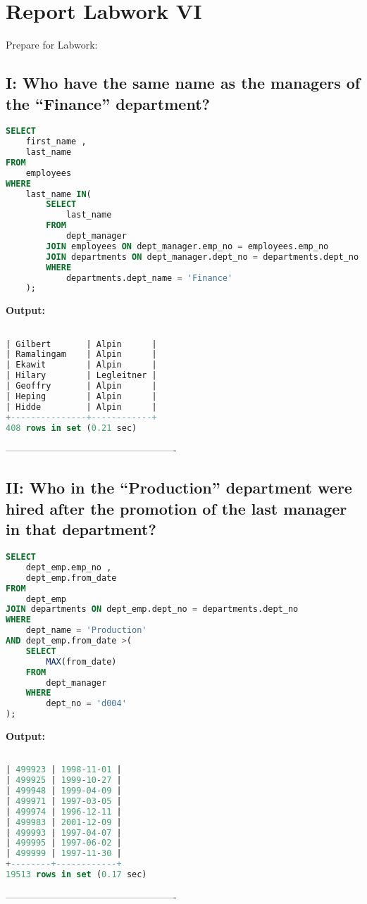 \documentclass[12pt]{report}
\begin{document}
\section*{Report Labwork VI}

Prepare for Labwork:

{\small
{}}

\subsection*{I: Who have the same name as the managers of the “Finance” department?}

\begin{lstlisting}[language=sql]
SELECT
	first_name ,
	last_name
FROM
	employees
WHERE
	last_name IN(
		SELECT
			last_name
		FROM
			dept_manager
		JOIN employees ON dept_manager.emp_no = employees.emp_no
		JOIN departments ON dept_manager.dept_no = departments.dept_no
		WHERE
			departments.dept_name = 'Finance'
	);
\end{lstlisting}


\textbf{Output:}

\begin{lstlisting}[language=sql]

| Gilbert       | Alpin      |
| Ramalingam    | Alpin      |
| Ekawit        | Alpin      |
| Hilary        | Legleitner |
| Geoffry       | Alpin      |
| Heping        | Alpin      |
| Hidde         | Alpin      |
+---------------+------------+
408 rows in set (0.21 sec)
\end{lstlisting}
----------------------------------------------------


\subsection*{II: Who in the “Production” department were hired after the promotion of the last manager in that department?}

\begin{lstlisting}[language=sql]
SELECT
	dept_emp.emp_no ,
	dept_emp.from_date
FROM
	dept_emp
JOIN departments ON dept_emp.dept_no = departments.dept_no
WHERE
	dept_name = 'Production'
AND dept_emp.from_date >(
	SELECT
		MAX(from_date)
	FROM
		dept_manager
	WHERE
		dept_no = 'd004'
);
\end{lstlisting}


\textbf{Output:}

\begin{lstlisting}[language=sql]

| 499923 | 1998-11-01 |
| 499925 | 1999-10-27 |
| 499948 | 1999-04-09 |
| 499971 | 1997-03-05 |
| 499974 | 1996-12-11 |
| 499983 | 2001-12-09 |
| 499993 | 1997-04-07 |
| 499995 | 1997-06-02 |
| 499999 | 1997-11-30 |
+--------+------------+
19513 rows in set (0.17 sec)

\end{lstlisting}
----------------------------------------------------
\end{document}
